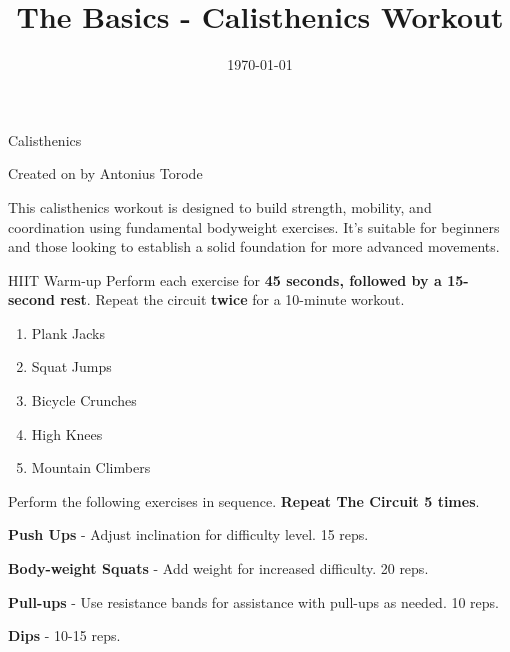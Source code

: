 \documentclass{article}
\newcounter{workout}
\newcounter{exercise}
\renewcommand{\maketitle}{
	\begin{center}
		{\Huge\bfseries\thetitle}
		
		\vspace{0.5em}
		
		Calisthenics
		
		\vspace{0.5em}
		
		Created on \thedate\hspace{0.5em}by Antonius Torode
	\end{center}
}
\begin{document}
	\begin{tcolorbox}[colback=gray!15,colframe=black,enforce breakable,pad at break*=5mm,boxrule=0.5mm]
		
		\title{The Basics - Calisthenics Workout}
		\date{\today}
		\maketitle
		
		This calisthenics workout is designed to build strength, mobility, and coordination using fundamental bodyweight exercises. It's suitable for beginners and those looking to establish a solid foundation for more advanced movements. 
		
	\begin{workoutbox}{HIIT Warm-up}
		Perform each exercise for \textbf{45 seconds, followed by a 15-second rest}. Repeat the circuit \textbf{twice} for a 10-minute workout.
		
		\begin{enumerate}
			\item Plank Jacks
			\item Squat Jumps
			\item Bicycle Crunches
			\item High Knees
			\item Mountain Climbers
		\end{enumerate}
	\end{workoutbox}
		
		Perform the following exercises in sequence. \textbf{Repeat The Circuit 5 times}.
		
		\begin{exercisebox}
			\textbf{Push Ups} - Adjust inclination for difficulty level. 15 reps.
		\end{exercisebox}
		
		\begin{exercisebox}
			\textbf{Body-weight Squats} - Add weight for increased difficulty. 20 reps.
		\end{exercisebox}
		
		\begin{exercisebox}
			\textbf{Pull-ups} - Use resistance bands for assistance with pull-ups as needed. 10 reps.
		\end{exercisebox}
		
		\begin{exercisebox}
			\textbf{Dips} - 10-15 reps.
		\end{exercisebox}
		

\end{tcolorbox}
\end{document}
